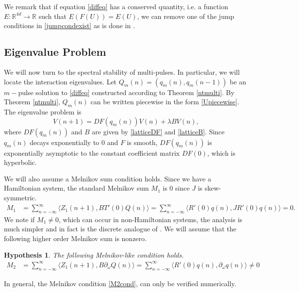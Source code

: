 \documentclass[12pt]{article}
\def\R{{\mathbb R}}
\newtheorem{hypothesis}{Hypothesis}
\begin{document}
\noindent We remark that if equation \eqref{diffeq} has a conserved quantity, i.e. a function $E: \R^{4d} \rightarrow \R$ such that $E(F(U)) = E(U)$, we can remove one of the jump conditions in \eqref{jumpcondexist} as is done in \cite{SandstedeStrut}.

\subsection{Eigenvalue Problem}

We will now turn to the spectral stability of multi-pulses. In particular, we will locate the interaction eigenvalues. Let $Q_m(n) = (q_m(n), q_m(n-1))$ be an $m-$pulse solution to \eqref{diffeq} constructed according to Theorem \ref{ntmulti}. By Theorem \ref{ntmulti}, $Q_m(n)$ can be written piecewise in the form \eqref{Upiecewise}. The eigenvalue problem is
\begin{equation}\label{multiEVP}
V(n+1) = DF(q_m(n)) V(n) + \lambda B V(n),
\end{equation}
where $DF(q_m(n))$ and $B$ are given by \eqref{latticeDF} and \eqref{latticeB}. Since $q_m(n)$ decays exponentially to 0 and $F$ is smooth, $DF(q_m(n))$ is exponentially asymptotic to the constant coefficient matrix $DF(0)$, which is hyperbolic.

We will also assume a Melnikov sum condition holds. Since we have a Hamiltonian system, the standard Melnikov sum $M_1$ is 0 since $J$ is skew-symmetric.
\begin{align}\label{MelnikovM1zero}
M_1 &= \sum_{n=-\infty}^\infty \langle Z_1(n+1), B T'(0)Q(n) \rangle
= \sum_{n=-\infty}^\infty \langle R'(0)q(n), J R'(0)q(n) \rangle
= 0.
\end{align}
We note if $M_1 \neq 0$, which can occur in non-Hamiltonian systems, the analysis is much simpler and in fact is the discrete analogue of \cite{Sandstede1998}. We will assume that the following higher order Melnikov sum is nonzero.

\begin{hypothesis}\label{melnikovhyp}
The following Melnikov-like condition holds.
\begin{align}\label{M2cond}
M_2 &= \sum_{n=-\infty}^\infty \langle Z_1(n+1), B \partial_\omega Q(n) \rangle = \sum_{n=-\infty}^\infty \langle R'(0) q(n), \partial_\omega q(n) \rangle \neq 0
\end{align}
\end{hypothesis}
\noindent In general, the Melnikov condition \eqref{M2cond}, can only be verified numerically.
\end{document}
